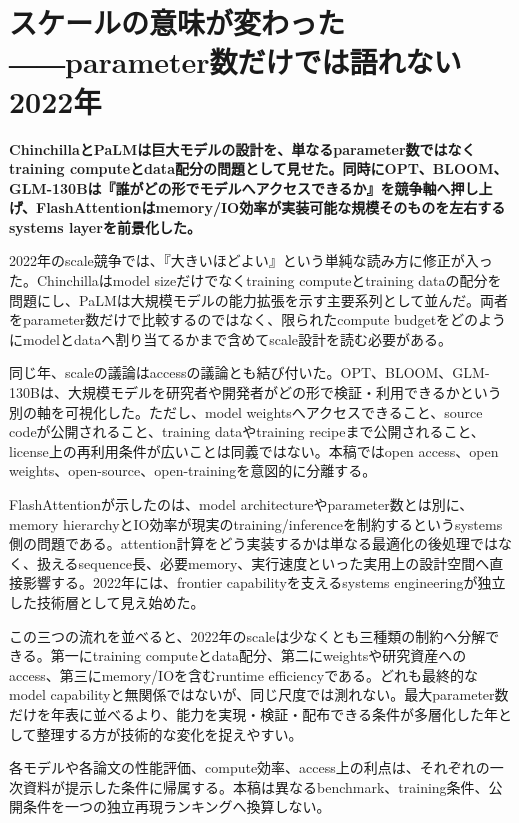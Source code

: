 \section{スケールの意味が変わった――parameter数だけでは語れない2022年}
\label{pkg:scale-access-systems}
\noindent\textbf{ChinchillaとPaLMは巨大モデルの設計を、単なるparameter数ではなくtraining computeとdata配分の問題として見せた。同時にOPT、BLOOM、GLM-130Bは『誰がどの形でモデルへアクセスできるか』を競争軸へ押し上げ、FlashAttentionはmemory/IO効率が実装可能な規模そのものを左右するsystems layerを前景化した。}\autocite{src-1f2518a3517b,src-4dd33abe1509,src-6ef0db0953a1,src-6ffa5c4e64ca,src-7823be169a27,src-93a582f1513c,src-99fae124f43c,src-be136777aa4f,src-d6fb00ab1ec9,src-e8da8e8f02bc}

2022年のscale競争では、『大きいほどよい』という単純な読み方に修正が入った。Chinchillaはmodel sizeだけでなくtraining computeとtraining dataの配分を問題にし、PaLMは大規模モデルの能力拡張を示す主要系列として並んだ。両者をparameter数だけで比較するのではなく、限られたcompute budgetをどのようにmodelとdataへ割り当てるかまで含めてscale設計を読む必要がある。\autocite{src-1f2518a3517b,src-6ffa5c4e64ca,src-7823be169a27,src-e8da8e8f02bc}


同じ年、scaleの議論はaccessの議論とも結び付いた。OPT、BLOOM、GLM-130Bは、大規模モデルを研究者や開発者がどの形で検証・利用できるかという別の軸を可視化した。ただし、model weightsへアクセスできること、source codeが公開されること、training dataやtraining recipeまで公開されること、license上の再利用条件が広いことは同義ではない。本稿ではopen access、open weights、open-source、open-trainingを意図的に分離する。\autocite{src-4dd33abe1509,src-6ef0db0953a1,src-93a582f1513c,src-99fae124f43c,src-d6fb00ab1ec9}


FlashAttentionが示したのは、model architectureやparameter数とは別に、memory hierarchyとIO効率が現実のtraining/inferenceを制約するというsystems側の問題である。attention計算をどう実装するかは単なる最適化の後処理ではなく、扱えるsequence長、必要memory、実行速度といった実用上の設計空間へ直接影響する。2022年には、frontier capabilityを支えるsystems engineeringが独立した技術層として見え始めた。\autocite{src-be136777aa4f}


この三つの流れを並べると、2022年のscaleは少なくとも三種類の制約へ分解できる。第一にtraining computeとdata配分、第二にweightsや研究資産へのaccess、第三にmemory/IOを含むruntime efficiencyである。どれも最終的なmodel capabilityと無関係ではないが、同じ尺度では測れない。最大parameter数だけを年表に並べるより、能力を実現・検証・配布できる条件が多層化した年として整理する方が技術的な変化を捉えやすい。\autocite{src-1f2518a3517b,src-4dd33abe1509,src-6ef0db0953a1,src-6ffa5c4e64ca,src-7823be169a27,src-93a582f1513c,src-99fae124f43c,src-be136777aa4f,src-d6fb00ab1ec9,src-e8da8e8f02bc}


\begin{claimboundary}
各モデルや各論文の性能評価、compute効率、access上の利点は、それぞれの一次資料が提示した条件に帰属する。本稿は異なるbenchmark、training条件、公開条件を一つの独立再現ランキングへ換算しない。\autocite{src-6ffa5c4e64ca,src-be136777aa4f,src-e8da8e8f02bc}
\end{claimboundary}
